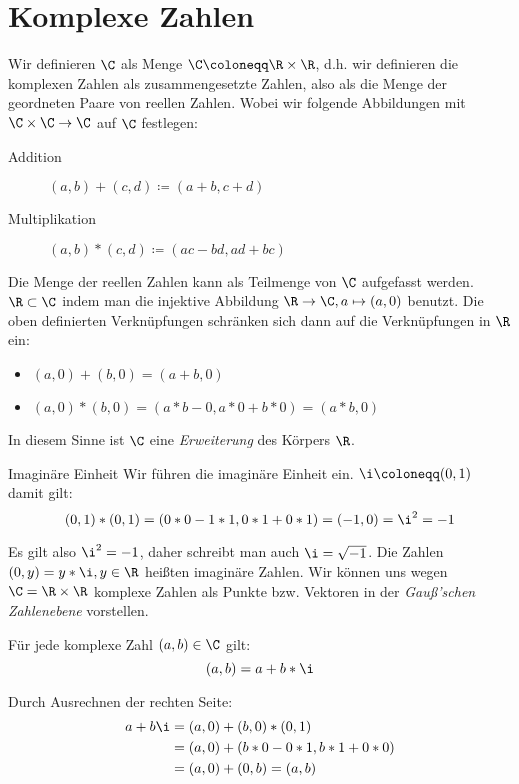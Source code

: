 \chapter{Komplexe Zahlen}
Wir definieren $\C$ als Menge $\C\coloneqq\R\times\R$, d.h. wir definieren die komplexen Zahlen als zusammengesetzte Zahlen, also als die Menge der geordneten Paare von reellen Zahlen.
Wobei wir folgende Abbildungen mit $\C\times\C\rightarrow\C$ auf $\C$ festlegen:
\begin{description}
	\item[Addition] $(a,b) + (c,d) \coloneqq (a+b,c+d)$
	\item[Multiplikation] $(a,b) * (c,d) \coloneqq (ac-bd,ad+bc)$
\end{description}

\bemerkung
Die Menge der reellen Zahlen kann als Teilmenge von $\C$ aufgefasst werden. $\R\subset\C$ indem man die injektive Abbildung $\R\rightarrow\C, a\mapsto (a,0)$ benutzt. Die oben definierten Verknüpfungen schränken sich dann auf die Verknüpfungen in $\R$ ein:
\begin{itemize}
  \item $(a,0)+(b,0)=(a+b,0)$
  \item $(a,0)*(b,0)=(a* b - 0, a* 0+ b* 0) = (a* b,0)$
\end{itemize}
In diesem Sinne ist $\C$ eine \emph{Erweiterung} des Körpers $\R$.

\begin{definition}{Imaginäre Einheit}
	Wir führen die imaginäre Einheit ein.
	$\i\coloneqq (0,1)$ damit gilt:
	\begin{equation*}
	  (0,1)*(0,1) = (0*0 -1*1,0*1+0*1)=(-1,0)=\i^2=-1
	\end{equation*}
\end{definition}

Es gilt also $\i^2=-1$, daher schreibt man auch $\i=\sqrt{-1}$. Die Zahlen $(0,y)=y*\i, y\in\R$ heißten imaginäre Zahlen.
Wir können uns wegen $\C=\R\times\R$ komplexe Zahlen als Punkte bzw. Vektoren in der \emph{Gauß'schen Zahlenebene} vorstellen.

\begin{satz}{}
  Für jede komplexe Zahl $(a,b)\in\C$ gilt:
  \begin{equation*}
    (a,b)=a+b*\i
  \end{equation*}
\end{satz}

\beweis Durch Ausrechnen der rechten Seite:
\begin{align*}
  a+b\i &= (a,0)+(b,0)*(0,1)\\
  &=(a,0)+(b*0-0*1,b*1+0*0)\\
  &=(a,0)+(0,b)=(a,b)
\end{align*}

